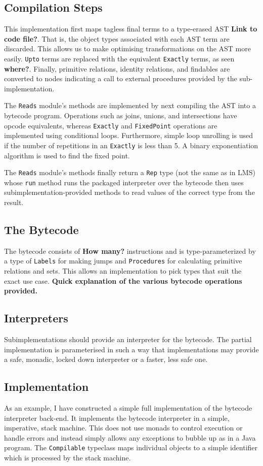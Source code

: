 \documentclass{report}
\newcommand \2[0]{\textbf{2}}
\newcommand \3[0]{\textbf{3}}
\newcommand{\todo}[1]{\textbf{#1}}
\begin{document}
\subsection{Compilation Steps}
This implementation first maps tagless final terms to a type-erased AST \todo{Link to code file?}. That is, the object types associated with each AST term are discarded. This allows us to make optimising transformations on the AST more easily. \texttt{Upto} terms are replaced with the equivalent \texttt{Exactly} terms, as seen \todo{where?}. Finally, primitive relations, identity relations, and findables are converted to nodes indicating a call to external procedures provided by the sub-implementation.

The \texttt{Reads} module's methods are implemented by next compiling the AST into a bytecode program. Operations such as joins, unions, and intersections have opcode equivalents, whereas \texttt{Exactly} and \texttt{FixedPoint} operations are implemented using conditional loops. Furthermore, simple loop unrolling is used if the number of repetitions in an \texttt{Exactly} is less than 5. A binary exponentiation algorithm is used to find the fixed point.

The \texttt{Reads} module's methods finally return a \texttt{Rep} type (not the same as in LMS) whose \texttt{run} method runs the packaged interpreter over the bytecode then uses subimplementation-provided methods to read values of the correct type from the result.


\subsection{The Bytecode}
The bytecode consists of \todo{How many?} instructions and is type-parameterized by a type of \texttt{Labels} for making jumps and \texttt{Procedures} for calculating primitive relations and sets. This allows an implementation to pick types that suit the exact use case.
\todo{Quick explanation of the various bytecode operations provided.}

\subsection{Interpreters}
Subimplementations should provide an interpreter for the bytecode. The partial implementation is parameterised in such a way that implementations may provide a safe, monadic, locked down interpreter or a faster, less safe one.

\subsection{Implementation}
As an example, I have constructed a simple full implementation of the bytecode interpreter back-end. It implements the bytecode interpreter in a simple, imperative, stack machine. This does not use monads to control execution or handle errors and instead simply allows any exceptions to bubble up as in a Java program. The \texttt{Compilable} typeclass maps individual objects to a simple identifier which is processed by the stack machine.
\end{document}
